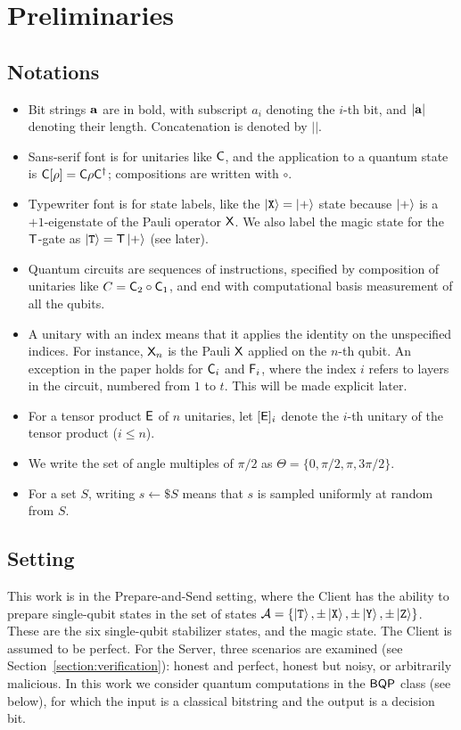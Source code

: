 
\section{Preliminaries}
\label{section:prelims}
\setcounter{theorem}{0}
\subsection{Notations}
\begin{itemize}
    \item Bit strings $\mathbf a$ are in bold, with subscript $a_i$ denoting the $i$-th bit, and $|\mathbf a|$ denoting their length. Concatenation is denoted by $||$.
    \item Sans-serif font is for unitaries like $\mathsf{C}$, and the application to a quantum state is $\mathsf{C}[\rho] = \mathsf{C}\rho\mathsf{C}^\dagger$; compositions are written with $\circ$.
    \item Typewriter font is for state labels, like the $\ket{\mathtt{X}} = \ket+$ state because $\ket+$ is a $+1$-eigenstate of the Pauli operator $\mathsf{X}$. We also label the magic state for the $\mathsf{T}$-gate as $\ket{\mathtt{T}}=\mathsf{T}\ket+$ (see later).
    \item Quantum circuits are sequences of instructions, specified by composition of unitaries like $C=\mathsf{C}_2\circ\mathsf{C}_1$, and end with computational basis measurement of all the qubits.
    \item
    A unitary with an index means that it applies the identity on the unspecified indices. For instance, $\mathsf{X}_n$ is the Pauli $\mathsf{X}$ applied on the $n$-th qubit. An exception in the paper holds for $\mathsf{C}_i$ and $\mathsf{F}_i$, where the index $i$ refers to layers in the circuit, numbered from $1$ to $t$. This will be made explicit later.
    \item For a tensor product $\mathsf{E}$ of $n$ unitaries, let $[\mathsf{E}]_i$ denote the $i$-th unitary of the tensor product ($i\leq n$).
    \item We write the set of angle multiples of $\pi/2$ as $\Theta=\{0, \pi/2, \pi, 3\pi/2\}$.
    \item For a set $S$, writing $s\gets\$ S$ means that $s$ is sampled uniformly at random from $S$.
\end{itemize}

\subsection{Setting}
This work is in the Prepare-and-Send setting, where the Client has the ability to prepare single-qubit states in the set of states $\mathcal A = \{\ket{\mathtt{T}}, \pm\ket{\mathtt{X}}, \pm\ket{\mathtt{Y}}, \pm\ket{\mathtt{Z}}\}$. These are the six single-qubit stabilizer states, and the magic state. The Client is assumed to be perfect. For the Server, three scenarios are examined (see Section~\ref{section:verification}): honest and perfect, honest but noisy, or arbitrarily malicious. In this work we consider quantum computations in the $\textsf{BQP}$ class (see below), for which the input is a classical bitstring and the output is a decision bit.

